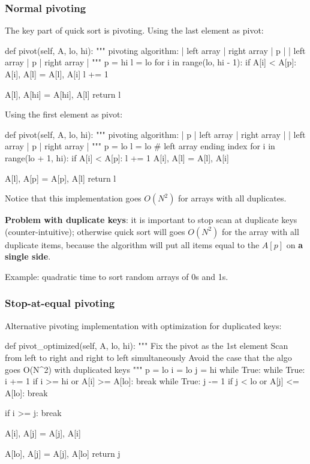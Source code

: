 \subsubsection{Normal pivoting}\label{section:pivot}
The key part of quick sort is pivoting. Using the last element as pivot:
\begin{python}
def pivot(self, A, lo, hi):
    """
    pivoting algorithm:
    | left array | right array | p |
    | left array | p | right array |
    """
    p = hi
    l = lo
    for i in range(lo, hi - 1):
        if A[i] < A[p]:
            A[i], A[l] = A[l], A[i]
            l += 1
            
    A[l], A[hi] = A[hi], A[l]
    return l
\end{python}

Using the first element as pivot:
\begin{python}
def pivot(self, A, lo, hi):
    """
    pivoting algorithm:
    | p | left array | right array |
    | left array | p | right array |
    """
    p = lo
    l = lo  # left array ending index
    for i in range(lo + 1, hi):
        if A[i] < A[p]:
            l += 1
            A[i], A[l] = A[l], A[i]

    A[l], A[p] = A[p], A[l]
    return l
\end{python}

Notice that this implementation goes $O(N^2)$ for arrays with all duplicates.

\textbf{Problem with duplicate keys}: it is important to stop scan at duplicate
keys (counter-intuitive); otherwise quick sort will goes $O(N^2)$ for the
array with all duplicate items, because the algorithm will put all items
equal to the $A[p]$ on \textbf{a single side}. 

Example: quadratic time to sort random arrays of 0s and 1s.

\subsubsection{Stop-at-equal pivoting}
Alternative pivoting implementation with optimization for duplicated keys:
\begin{python}
def pivot_optimized(self, A, lo, hi):
    """
    Fix the pivot as the 1st element
    Scan from left to right and right to left simultaneously
    Avoid the case that the algo goes O(N^2) with duplicated keys
    """
    p = lo
    i = lo
    j = hi
    while True:
        while True:
            i += 1
            if i >= hi or A[i] >= A[lo]:
                break
        while True:
            j -= 1
            if j < lo or A[j] <= A[lo]:
                break

        if i >= j:
            break

        A[i], A[j] = A[j], A[i]

    A[lo], A[j] = A[j], A[lo]
    return j

\end{python}

